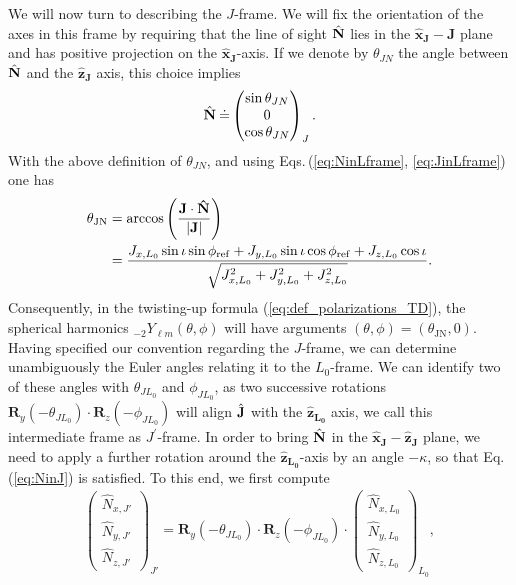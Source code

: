\documentclass[%
aps,
prd,
amssymb,
amsmath,
amsfonts,
eqsecnum,
showpacs,
nofootinbib,
floatfix,
twocolumn,
twoside,
a4paper,
superscriptaddress
]{revtex4-1}
\newcommand{\x}{\mathbf{\hat{x}}}
\newcommand{\z}{\mathbf{\hat{z}}}
\newcommand{\hN}{{\hat{\bf{N}}}}
\newcommand{\hJ}{{\hat{\bf{J}}}}
\newcommand{\J}{\mathbf{J}}
\newcommand{\LO}{\mathbf{L_0}}
\begin{document}
We will now turn to describing the $J$-frame. We will fix the orientation of the axes in this frame by requiring that the line of sight $\hN$ lies in the $\x_{\J}-\J$ plane and has positive projection on the $\x_{\J}$-axis. If we denote by $\theta_{JN}$ the angle between $\hN$ and the $\z_{\J}$ axis, this choice implies
\begin{equation}
\label{eq:NinJ}
 \hN \:\dot= \begin{pmatrix} \sin \theta_{JN} \\ 0\\ \cos \theta_{JN} \end{pmatrix}_{J}.
 \end{equation}
With the above definition of $\theta_{JN}$, and using Eqs.\,(\ref{eq:NinLframe}, \ref{eq:JinLframe}) one has 
\begin{align}
    \theta_{\rm{JN}}&=\arccos\left({\frac{\bf{J}\cdot\hN}{| \J | }}\right)\\
    &=\frac{J_{x,L_0}\sin{\iota}\sin{\phi_{\rm{ref}}}+ J_{y,L_0}\sin{\iota}\cos{\phi_{\rm{ref}}}+J_{z,L_0}\cos\iota}{\sqrt{J_{x,L_0}^2+J_{y,L_0}^2+J_{z,L_0}^2}}.
\end{align}
Consequently, in the twisting-up formula (\ref{eq:def_polarizations_TD}), the spherical harmonics $_{-2}Y_{\ell m}(\theta,\phi)$ will have arguments $(\theta,\phi)=(\theta_{\mathrm{JN}},0)$.  
%
Having specified our convention regarding the $J$-frame, we can determine unambiguously the Euler angles relating it to the $L_0$-frame. We can identify two of these angles with $\theta_{JL_0}$ and $\phi_{JL_0}$, as two successive rotations $\mathbf{R}_{y}(-\theta_{JL_0}) \cdot \mathbf{R}_{z}(-\phi_{JL_0})$ will align $\hJ$ with the $\z_{\LO}$ axis, we call this intermediate frame as $J^\prime$-frame. In order to bring $\hN$ in the $\x_{\J}-\z_{\J}$ plane, we need to apply a further rotation around the $\z_{\LO}$-axis by an angle $-\kappa$, so that Eq.\,(\ref{eq:NinJ}) is satisfied. To this end, we first compute
\begin{align}
    \begin{pmatrix} \hat N_{x,J'}\\\hat N_{y,J'}\\\hat N_{z,J'}\end{pmatrix}_{J'} =\mathbf{R}_{y}(-\theta_{JL_0}) \cdot \mathbf{R}_{z}(-\phi_{JL_0}) \cdot \begin{pmatrix} \hat N_{x,L_0}\\\hat N_{y,L_0}\\\hat N_{z,L_0}\end{pmatrix}_{L_0},
\end{align}
\end{document}
